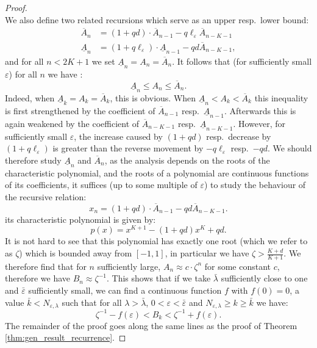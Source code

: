 \documentclass[12pt]{report}
\begin{document}
\begin{proof}
\begin{equation}
\end{equation}
We also define two related recursions which serve as an upper resp.~lower bound:
\begin{align}
\overline{A}_n  &= (1+qd) \cdot \overline{A}_{n-1} - q \ell_\varepsilon \overline{A}_{n-K-1}\\
\underline{A}_n &= (1+q\ell_\varepsilon) \cdot \underline{A}_{n-1} - q d \overline{A}_{n-K-1},
\end{align}
and for all $n < 2K + 1$ we set $\underline{A}_n = A_n = \overline{A}_n$. It follows that (for sufficiently small $\varepsilon$) for all $n$ we have :
$$
\underline{A}_n \leq A_n \leq \overline{A}_n.
$$
Indeed, when $\underline{A}_k = A_k = \overline{A}_k$, this is obvious. When $\underline{A}_n < A_k < \overline{A}_k$ this inequality is first strengthened by the coefficient of $\overline{A}_{n-1}$ resp.~$\underline{A}_{n-1}$. Afterwards this is again weakened by the coefficient of $\overline{A}_{n-K-1}$ resp.~$\underline{A}_{n-K-1}$. However, for sufficiently small $\varepsilon$, the increase caused by $(1+qd)$ resp.~decrease by $(1+q\ell_\varepsilon)$ is greater than the reverse movement by $-q\ell_{\varepsilon}$ resp.~$-qd$. We should therefore study $\underline{A}_n$ and $\overline{A}_n$, as the analysis depends on the roots of the characteristic polynomial, and the roots of a polynomial are continuous functions of its coefficients, it suffices (up to some multiple of $\varepsilon$) to study the behaviour of the recursive relation:
$$
x_n=(1+qd) \cdot \overline{A}_{n-1} - q d \overline{A}_{n-K-1}.
$$
its characteristic polynomial is given by:
$$
p(x)=x^{K+1} - (1+qd)x^K + qd.
$$
It is not hard to see that this polynomial has exactly one root (which we refer to as $\zeta$) which is bounded away from $[-1, 1]$, in particular we have $\zeta > \frac{K+d}{K+1}$. We therefore find that for $n$ sufficiently large, $A_n \approx c \cdot \zeta^n$ for some constant $c$, therefore we have $B_n \approx \zeta^{-1}$. This shows that if we take $\bar \lambda$ sufficiently close to one and $\bar \varepsilon$ sufficiently small, we can find a continuous function $f$ with $f(0)=0$, a value $\bar k < N_{\varepsilon, \lambda}$ such that for all $\lambda>\bar \lambda$, $0 < \varepsilon < \bar \varepsilon$ and $N_{\varepsilon, \lambda} \geq k \geq \bar k$ we have:
$$
\zeta^{-1} - f(\varepsilon) < B_k < \zeta^{-1} + f(\varepsilon).
$$
The remainder of the proof goes along the same lines as the proof of Theorem \ref{thm:gen_result_recurrence}.
\end{proof}
\end{document}
